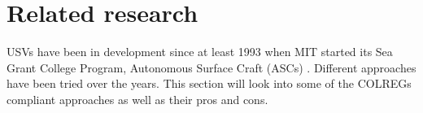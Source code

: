\chapter{Related research}
USVs have been in development since at least 1993 when MIT started its Sea Grant College Program, Autonomous Surface Craft (ASCs) \cite{manley2008unmanned}. Different approaches have been tried over the years. This section will look into some of the COLREGs compliant approaches as well as their pros and cons.



